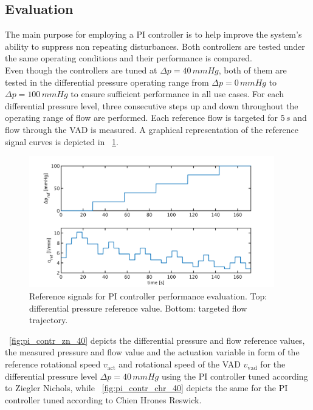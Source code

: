 \subsection{Evaluation}
The main purpose for employing a PI controller is to help improve the system's ability to suppress non repeating disturbances.
Both controllers are tested under the same operating conditions and their performance is compared.
\\Even though the controllers are tuned at $\Delta{p}=40\,mmHg$, both of them  are tested in the differential pressure operating range from $\Delta{p}=0\,mmHg$ to $\Delta{p}=100\,mmHg$ to ensure sufficient performance in all use cases.
For each differential pressure level, three consecutive steps up and down throughout the operating range of flow are performed. Each reference flow is targeted for $5\,s$ and flow through the VAD is measured. A graphical representation of the reference signal curves is depicted in \figurename~\ref{fig:PI_control_ref_signals}.
\begin{figure}[ht]
  \centering
  \includegraphics[width=0.95\textwidth]{images/chapt_5/PI_control_ref_signals.pdf}
  \caption[Reference signals for PI controller performance evaluation]{Reference signals for PI controller performance evaluation. Top: differential pressure reference value. Bottom: targeted flow trajectory.}
  \label{fig:PI_control_ref_signals}
\end{figure}
\figurename~\ref{fig:pi_contr_zn_40} depicts the differential pressure and flow reference values, the measured pressure and flow value and the actuation variable in form of the reference rotational speed $v_{\mathrm{act}}$ and rotational speed of the VAD $v_{\mathrm{vad}}$ for the differential pressure level $\Delta{p}=40\,mmHg$ using the PI controller tuned according to Ziegler Nichols, while \figurename~\ref{fig:pi_contr_chr_40} depicts the same for the PI controller tuned according to Chien Hrones Reswick.
